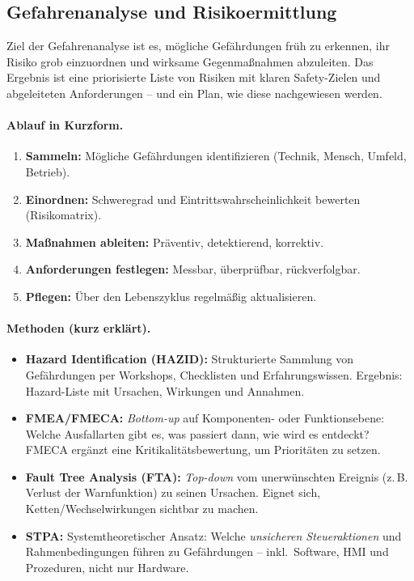 \subsection{Gefahrenanalyse und Risikoermittlung}
Ziel der Gefahrenanalyse ist es, mögliche Gefährdungen früh zu erkennen, ihr Risiko grob einzuordnen und wirksame Gegenmaßnahmen abzuleiten. Das Ergebnis ist eine priorisierte Liste von Risiken mit klaren Safety-Zielen und abgeleiteten Anforderungen – und ein Plan, wie diese nachgewiesen werden.

\paragraph{Ablauf in Kurzform.}
\begin{enumerate}
  \item \textbf{Sammeln:} Mögliche Gefährdungen identifizieren (Technik, Mensch, Umfeld, Betrieb).
  \item \textbf{Einordnen:} Schweregrad und Eintrittswahrscheinlichkeit bewerten (Risikomatrix).
  \item \textbf{Maßnahmen ableiten:} Präventiv, detektierend, korrektiv.
  \item \textbf{Anforderungen festlegen:} Messbar, überprüfbar, rückverfolgbar.
  \item \textbf{Pflegen:} Über den Lebenszyklus regelmäßig aktualisieren.
\end{enumerate}

\paragraph{Methoden (kurz erklärt).}
\begin{itemize}
  \item \textbf{Hazard Identification (HAZID):} Strukturierte Sammlung von Gefährdungen per Workshops, Checklisten und Erfahrungswissen. Ergebnis: Hazard-Liste mit Ursachen, Wirkungen und Annahmen.
  \item \textbf{FMEA/FMECA:} \emph{Bottom-up} auf Komponenten- oder Funktionsebene: Welche Ausfallarten gibt es, was passiert dann, wie wird es entdeckt? FMECA ergänzt eine Kritikalitätsbewertung, um Prioritäten zu setzen.
  \item \textbf{Fault Tree Analysis (FTA):} \emph{Top-down} vom unerwünschten Ereignis (z.\,B. Verlust der Warnfunktion) zu seinen Ursachen. Eignet sich, Ketten/Wechselwirkungen sichtbar zu machen.
  \item \textbf{STPA:} Systemtheoretischer Ansatz: Welche \emph{unsicheren Steueraktionen} und Rahmenbedingungen führen zu Gefährdungen – inkl.\ Software, HMI und Prozeduren, nicht nur Hardware.
\end{itemize}

